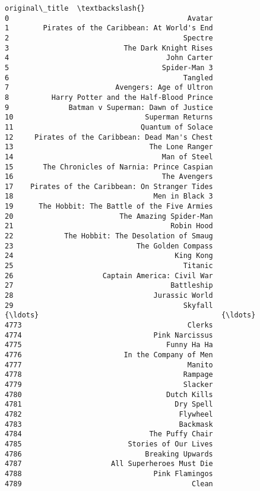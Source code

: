 \documentclass[11pt]{article}
\begin{document}
\begin{Verbatim}[commandchars=\\\{\}]
                                   original\_title  \textbackslash{}
0                                          Avatar   
1        Pirates of the Caribbean: At World's End   
2                                         Spectre   
3                           The Dark Knight Rises   
4                                     John Carter   
5                                    Spider-Man 3   
6                                         Tangled   
7                         Avengers: Age of Ultron   
8          Harry Potter and the Half-Blood Prince   
9              Batman v Superman: Dawn of Justice   
10                               Superman Returns   
11                              Quantum of Solace   
12     Pirates of the Caribbean: Dead Man's Chest   
13                                The Lone Ranger   
14                                   Man of Steel   
15       The Chronicles of Narnia: Prince Caspian   
16                                   The Avengers   
17    Pirates of the Caribbean: On Stranger Tides   
18                                 Men in Black 3   
19      The Hobbit: The Battle of the Five Armies   
20                         The Amazing Spider-Man   
21                                     Robin Hood   
22            The Hobbit: The Desolation of Smaug   
23                             The Golden Compass   
24                                      King Kong   
25                                        Titanic   
26                     Captain America: Civil War   
27                                     Battleship   
28                                 Jurassic World   
29                                        Skyfall   
{\ldots}                                           {\ldots}   
4773                                       Clerks   
4774                               Pink Narcissus   
4775                                  Funny Ha Ha   
4776                        In the Company of Men   
4777                                       Manito   
4778                                      Rampage   
4779                                      Slacker   
4780                                  Dutch Kills   
4781                                    Dry Spell   
4782                                     Flywheel   
4783                                     Backmask   
4784                              The Puffy Chair   
4785                         Stories of Our Lives   
4786                             Breaking Upwards   
4787                     All Superheroes Must Die   
4788                               Pink Flamingos   
4789                                        Clean   

\end{Verbatim}
\end{document}

